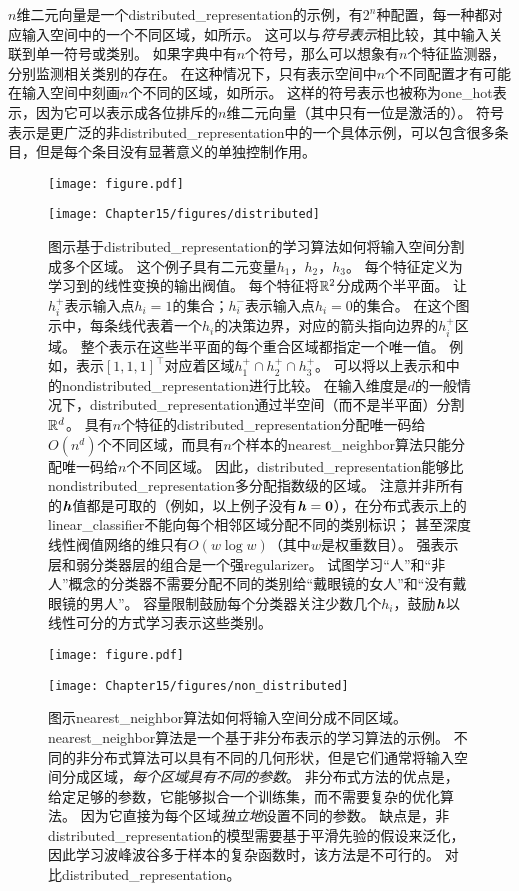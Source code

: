 
$n$维二元向量是一个\gls{distributed_representation}的示例，有$2^n$种配置，每一种都对应输入空间中的一个不同区域，如所示。
这可以与\emph{符号表示}相比较，其中输入关联到单一符号或类别。
如果字典中有$n$个符号，那么可以想象有$n$个特征监测器，分别监测相关类别的存在。
在这种情况下，只有表示空间中$n$个不同配置才有可能在输入空间中刻画$n$个不同的区域，如所示。
这样的符号表示也被称为\gls{one_hot}表示，因为它可以表示成各位排斥的$n$维二元向量（其中只有一位是激活的）。
符号表示是更广泛的非\gls{distributed_representation}中的一个具体示例，可以包含很多条目，但是每个条目没有显著意义的单独控制作用。

\begin{figure}[!htb]
\ifOpenSource
\centerline{\texttt{[image: figure.pdf]}}
\else
\centerline{\texttt{[image: Chapter15/figures/distributed]}}
\fi
\caption{图示基于\gls{distributed_representation}的学习算法如何将输入空间分割成多个区域。
这个例子具有二元变量$h_1$，$h_2$，$h_3$。
每个特征定义为学习到的线性变换的输出阀值。
每个特征将$\mathbb{R}^2$分成两个半平面。
让$h_i^+$表示输入点$h_i=1$的集合；$h_i^-$表示输入点$h_i=0$的集合。
在这个图示中，每条线代表着一个$h_i$的决策边界，对应的箭头指向边界的$h_i^+$区域。
整个表示在这些半平面的每个重合区域都指定一个唯一值。
例如，表示$[1,1,1]^\top$对应着区域$h_1^+ \cap h_2^+ \cap h_3^+$。
可以将以上表示和中的\gls{nondistributed_representation}进行比较。
在输入维度是$d$的一般情况下，\gls{distributed_representation}通过半空间（而不是半平面）分割$\mathbb{R}^d$。
具有$n$个特征的\gls{distributed_representation}分配唯一码给$O(n^d)$个不同区域，而具有$n$个样本的\gls{nearest_neighbor}算法只能分配唯一码给$n$个不同区域。
因此，\gls{distributed_representation}能够比\gls{nondistributed_representation}多分配指数级的区域。
注意并非所有的$\boldsymbol{\mathit{h}}$值都是可取的（例如，以上例子没有$\boldsymbol{\mathit{h}}=\mathbf{0}$），在分布式表示上的\gls{linear_classifier}不能向每个相邻区域分配不同的类别标识；
甚至深度线性阀值网络的维只有$O(w\log w)$（其中$w$是权重数目）\citep{sontag1998vc}。
强表示层和弱分类器层的组合是一个强\gls{regularizer}。
试图学习``人''和``非人''概念的分类器不需要分配不同的类别给``戴眼镜的女人''和``没有戴眼镜的男人''。
容量限制鼓励每个分类器关注少数几个$h_i$，鼓励$\boldsymbol{\mathit{h}}$以线性可分的方式学习表示这些类别。
}
\label{fig:chap15_distributed}
\end{figure}

\begin{figure}[!htb]
\ifOpenSource
\centerline{\texttt{[image: figure.pdf]}}
\else
\centerline{\texttt{[image: Chapter15/figures/non\_distributed]}}
\fi
\caption{图示\gls{nearest_neighbor}算法如何将输入空间分成不同区域。
\gls{nearest_neighbor}算法是一个基于非分布表示的学习算法的示例。
不同的非分布式算法可以具有不同的几何形状，但是它们通常将输入空间分成区域，\emph{每个区域具有不同的参数}。
非分布式方法的优点是，给定足够的参数，它能够拟合一个训练集，而不需要复杂的优化算法。
因为它直接为每个区域\emph{独立地}设置不同的参数。
缺点是，非\gls{distributed_representation}的模型需要基于平滑先验的假设来泛化，因此学习波峰波谷多于样本的复杂函数时，该方法是不可行的。
对比\gls{distributed_representation}。
}
\label{fig:chap15_nondistributed}
\end{figure}

